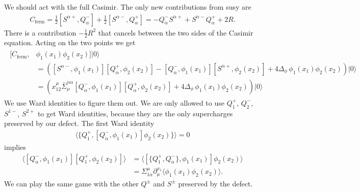 \documentclass[letterpaper]{article}
\def\a{{\alpha}}
\def\ad{{\dot{\alpha}}}
\begin{document}
We should act with the full Casimir.
The only new contributions from susy are
\begin{align}
 C_{\text{ferm}} =
 \frac{1}{2} [S^{\ad+}, Q^-_\ad] + 
 \frac{1}{2} [S^{\a-}, Q^+_\a] =
 -Q^-_\ad S^{\ad+} + S^{\ad-} Q^+_\a + 2R.
\end{align}
There is a contribution $-\frac12 R^2$ that cancels between the two sides of the Casimir equation.
Acting on the two points we get
\begin{align}
\begin{split}
 [C_{\text{ferm}}, & \phi_1(x_1) \phi_2(x_2) ] |0\rangle \\
 & =
 \left( 
    [S^{\a-},  \phi_1(x_1)] [Q^+_\a,   \phi_2(x_2)]
  - [Q^-_\ad,  \phi_1(x_1)] [S^{\ad+}, \phi_2(x_2)]
  + 4 \Delta_\phi \, \phi_1(x_1) \phi_2(x_2)
 \right) |0\rangle \\
 & = 
 \left(
    x_{12}^\mu \bar \Sigma_\mu^{\ad\a} [Q^-_\ad, \phi_1(x_1)] [Q^+_\a, \phi_2(x_2)]
  + 4 \Delta_\phi \, \phi_1(x_1) \phi_2(x_2)
 \right) |0\rangle
\end{split}
\end{align}
We use Ward identities to figure them out.
We are only allowed to use $Q^+_1$, $Q^-_2$, $S^{1-}$, $S^{2+}$ to get Ward identities, because they are the only supercharges preserved by our defect.
The first Ward identity
\begin{align}
 \langle \{ Q_1^+, [Q_\ad^-, \phi_1(x_1)] \phi_2(x_2) \} \rangle = 0
\end{align}
implies
\begin{align}
 \langle [Q_\ad^-, \phi_1(x_1)] [Q_1^+, \phi_2(x_2)] \rangle 
 & = \langle [ \{Q_1^+, Q_\ad^-\}, \phi_1(x_1)] \phi_2(x_2) \rangle \\
 & = \Sigma^\mu_{1\ad} \partial_\mu^{x_1} \langle \phi_1(x_1) \phi_2(x_2) \rangle. 
\end{align}
We can play the same game with the other $Q^\pm$ and $S^\pm$ preserved by the defect.
\end{document}
